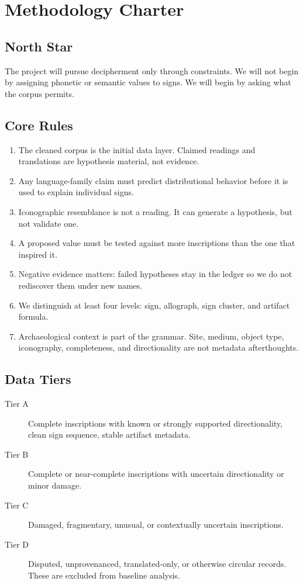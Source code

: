 \section{Methodology Charter}

\subsection{North Star}

The project will pursue decipherment only through constraints. We will not begin by assigning phonetic or semantic values to signs. We will begin by asking what the corpus permits.

\subsection{Core Rules}

\begin{enumerate}
  \item The cleaned corpus is the initial data layer. Claimed readings and translations are hypothesis material, not evidence.
  \item Any language-family claim must predict distributional behavior before it is used to explain individual signs.
  \item Iconographic resemblance is not a reading. It can generate a hypothesis, but not validate one.
  \item A proposed value must be tested against more inscriptions than the one that inspired it.
  \item Negative evidence matters: failed hypotheses stay in the ledger so we do not rediscover them under new names.
  \item We distinguish at least four levels: sign, allograph, sign cluster, and artifact formula.
  \item Archaeological context is part of the grammar. Site, medium, object type, iconography, completeness, and directionality are not metadata afterthoughts.
\end{enumerate}

\subsection{Data Tiers}

\begin{description}
  \item[Tier A] Complete inscriptions with known or strongly supported directionality, clean sign sequence, stable artifact metadata.
  \item[Tier B] Complete or near-complete inscriptions with uncertain directionality or minor damage.
  \item[Tier C] Damaged, fragmentary, unusual, or contextually uncertain inscriptions.
  \item[Tier D] Disputed, unprovenanced, translated-only, or otherwise circular records. These are excluded from baseline analysis.
\end{description}

